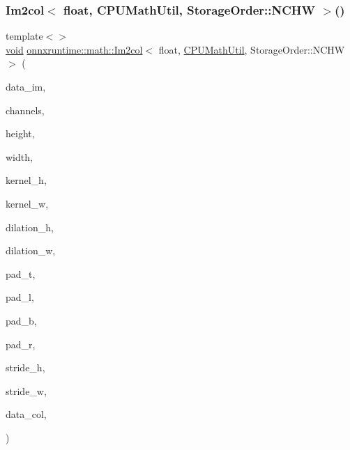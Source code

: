 \subsubsection{\texorpdfstring{Im2col$<$ float, C\+P\+U\+Math\+Util, Storage\+Order\+::\+N\+C\+H\+W $>$()}{Im2col< float, CPUMathUtil, StorageOrder::NCHW >()}}
{\footnotesize\ttfamily template$<$$>$ \\
\mbox{\hyperlink{mlasi_8h_a88f941d423cb2a819b70a1358982b1a6}{void}} \mbox{\hyperlink{namespaceonnxruntime_1_1math_a5f4da90f31ab7005ff9eb336534d62e9}{onnxruntime\+::math\+::\+Im2col}}$<$ float, \mbox{\hyperlink{classonnxruntime_1_1CPUMathUtil}{C\+P\+U\+Math\+Util}}, Storage\+Order\+::\+N\+C\+HW $>$ (\begin{DoxyParamCaption}\item[{const float $\ast$}]{data\+\_\+im,  }\item[{const int64\+\_\+t}]{channels,  }\item[{const int64\+\_\+t}]{height,  }\item[{const int64\+\_\+t}]{width,  }\item[{const int64\+\_\+t}]{kernel\+\_\+h,  }\item[{const int64\+\_\+t}]{kernel\+\_\+w,  }\item[{const int64\+\_\+t}]{dilation\+\_\+h,  }\item[{const int64\+\_\+t}]{dilation\+\_\+w,  }\item[{const int64\+\_\+t}]{pad\+\_\+t,  }\item[{const int64\+\_\+t}]{pad\+\_\+l,  }\item[{const int64\+\_\+t}]{pad\+\_\+b,  }\item[{const int64\+\_\+t}]{pad\+\_\+r,  }\item[{const int64\+\_\+t}]{stride\+\_\+h,  }\item[{const int64\+\_\+t}]{stride\+\_\+w,  }\item[{float $\ast$}]{data\+\_\+col,  }\item[{\mbox{\hyperlink{classonnxruntime_1_1CPUMathUtil}{C\+P\+U\+Math\+Util}} $\ast$}]{ }\end{DoxyParamCaption})}

\mbox{\label{namespaceonnxruntime_1_1math_a5f7576e544a884d7245a591113f0c23f}} 
